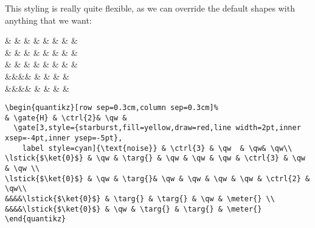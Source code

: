 \documentclass[aps,pra,10pt,nofootinbib]{revtex4}
\begin{document}
This styling is really quite flexible, as we can override the default shapes with anything that we want:
\begin{Code}
\begin{center}
\begin{quantikz}[row sep=0.3cm,column sep=0.3cm]%
&  & & \qw &  &  & \qw  & \qw & \qw\\
 & \qw & \targ{} & \qw & \qw & \qw &  & \qw & \qw \\
 & \qw & \targ{}& \qw & \qw & \qw & \qw &  & \qw\\
&&&& & \targ{} & \targ{} & \qw & \meter{} \\
&&&& & \qw & \targ{} & \targ{} & \meter{} 
\end{quantikz}
\end{center}
\tcblower
\begin{lstlisting}
\begin{quantikz}[row sep=0.3cm,column sep=0.3cm]%
& \gate{H} & \ctrl{2}& \qw & 
  \gate[3,style={starburst,fill=yellow,draw=red,line width=2pt,inner xsep=-4pt,inner ysep=-5pt},
    label style=cyan]{\text{noise}} & \ctrl{3} & \qw  & \qw& \qw\\
\lstick{$\ket{0}$} & \qw & \targ{} & \qw & \qw & \qw & \ctrl{3} & \qw & \qw \\
\lstick{$\ket{0}$} & \qw & \targ{}& \qw & \qw & \qw & \qw & \ctrl{2} & \qw\\
&&&&\lstick{$\ket{0}$} & \targ{} & \targ{} & \qw & \meter{} \\
&&&&\lstick{$\ket{0}$} & \qw & \targ{} & \targ{} & \meter{} 
\end{quantikz}
\end{lstlisting}
\end{Code}
\end{document}
